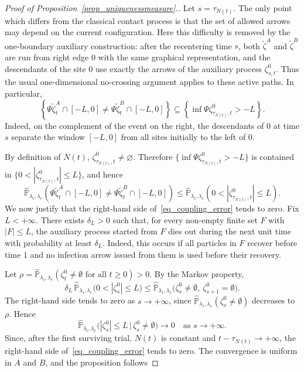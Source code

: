\documentclass[10pt,a4paper]{amsart}
\begin{document}
\begin{proof}[{Proof of Proposition~\ref{prop_uniquenessmeasure}.}]
	Let $s=\tau_{N(t)}$.  The only point which differs from the classical
	contact process is that the set of allowed arrows may depend on the
	current configuration.  Here this difficulty is removed by the
	one-boundary auxiliary construction: after the recentering time $s$,
	both $\widetilde\zeta^A$ and $\widetilde\zeta^B$ are run from right edge
	$0$ with the same graphical representation, and the descendants of the
	site $0$ use exactly the arrows of the auxiliary process
	$\zeta^0_{s,t}$.  Thus the usual one-dimensional no-crossing argument
	applies to these active paths.  In particular,
	\[
	\left\{
	\Psi\widetilde\zeta^A_t\cap[-L,0]
	\neq
	\Psi\widetilde\zeta^B_t\cap[-L,0]
	\right\}
	\subseteq
	\left\{
	\inf\Psi\zeta^0_{\tau_{N(t)},t}>-L
	\right\}.
	\]
	Indeed, on the complement of the event on the right, the descendants of
	$0$ at time $s$ separate the window $[-L,0]$ from all sites initially to
	the left of $0$.
	
	By definition of $N(t)$, $\zeta^0_{\tau_{N(t)},t}\neq\varnothing$.
	Therefore $\{\inf\Psi\zeta^0_{\tau_{N(t)},t}>-L\}$ is contained in
	$\{0<|\zeta^0_{\tau_{N(t)},t}|\le L\}$, and hence
	\begin{equation}
		\widehat{\mathbb P}_{\lambda_i,\lambda_e}
		\left(
		\Psi\widetilde\zeta^A_t\cap[-L,0]
		\neq
		\Psi\widetilde\zeta^B_t\cap[-L,0]
		\right)
		\le
		\widehat{\mathbb P}_{\lambda_i,\lambda_e}
		\left(
		0<|\zeta^0_{\tau_{N(t)},t}|\le L
		\right).
		\tag{3.2}
		\label{eq_coupling_error}
	\end{equation}
	We now justify that the right-hand side of~\eqref{eq_coupling_error} tends to zero. Fix $L<+\infty$. There exists $\delta_L>0$ such that, for every non-empty finite set $F$ with $|F|\leq L$, the auxiliary process started from $F$ dies out during the next unit time with probability at least $\delta_L$. Indeed, this occurs if all particles in $F$ recover before time $1$ and no infection arrow issued from them is used before their recovery.
	
	Let $\rho=\widehat{\mathbb{P}}_{\lambda_i,\lambda_e}(\zeta_t^0\neq\emptyset\text{ for all }t\geq0)>0$. By the Markov property,
	\[
	\delta_L\,
	\widehat{\mathbb{P}}_{\lambda_i,\lambda_e}
	\big(0<|\zeta_s^0|\leq L\big)
	\leq
	\widehat{\mathbb{P}}_{\lambda_i,\lambda_e}
	\big(\zeta_s^0\neq\emptyset,\ \zeta_{s+1}^0=\emptyset\big).
	\]
	The right-hand side tends to zero as $s\to+\infty$, since $\widehat{\mathbb{P}}_{\lambda_i,\lambda_e}(\zeta_s^0\neq\emptyset)$ decreases to $\rho$. Hence
	\[
	\widehat{\mathbb{P}}_{\lambda_i,\lambda_e}
	\big(|\zeta_s^0|\leq L\,\big|\,\zeta_s^0\neq\emptyset\big)
	\longrightarrow0
	\quad\text{as }s\to+\infty.
	\]
	Since, after the first surviving trial, $N(t)$ is constant and $t-\tau_{N(t)}\to+\infty$, the right-hand side of~\eqref{eq_coupling_error} tends to zero. The convergence is uniform in $A$ and $B$, and the proposition follows
	\end{proof}
\end{document}
